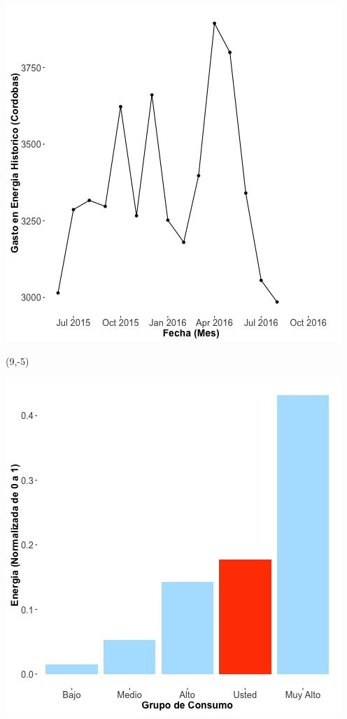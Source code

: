 \documentclass{article}\usepackage[]{graphicx}\usepackage[]{color}
\newenvironment{knitrout}{}{} %
\begin{document}
\begin{knitrout}
\color{fgcolor}
\includegraphics[scale=0.65]{figure/A21_historico_cordobas} 
\end{knitrout}

 \begin{textblock}{1}(9,-5)
\begin{minipage}{20em}
\begingroup

\endgroup
\end{minipage}
\end{textblock}


\begin{knitrout}
\color{fgcolor}
\includegraphics[scale=0.65]{figure/A21_neighbor_plot} 
\end{knitrout}
\end{document}
